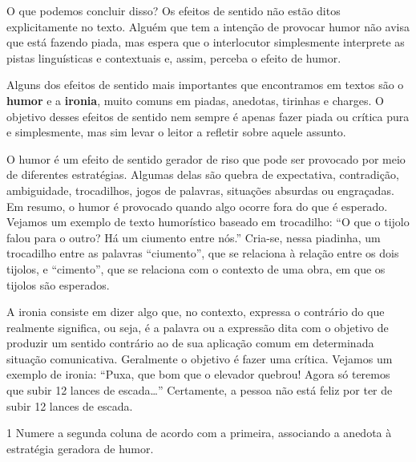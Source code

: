 O que podemos concluir disso? Os efeitos de sentido não estão ditos
explicitamente no texto. Alguém que tem a intenção de provocar humor não
avisa que está fazendo piada, mas espera que o interlocutor simplesmente
interprete as pistas linguísticas e contextuais e, assim, perceba o
efeito de humor.

Alguns dos efeitos de sentido mais importantes que encontramos em textos
são o \textbf{humor} e a \textbf{ironia}, muito comuns em piadas,
anedotas, tirinhas e charges. O objetivo desses efeitos de sentido nem
sempre é apenas fazer piada ou crítica pura e simplesmente, mas sim
levar o leitor a refletir sobre aquele assunto.

O humor é um efeito de sentido gerador de riso que pode ser provocado
por meio de diferentes estratégias. Algumas delas são quebra de
expectativa, contradição, ambiguidade, trocadilhos, jogos de palavras,
situações absurdas ou engraçadas. Em resumo, o humor é provocado quando
algo ocorre fora do que é esperado. Vejamos um exemplo de texto
humorístico baseado em trocadilho: ``O que o tijolo falou para o outro?
Há um ciumento entre nós.'' Cria-se, nessa piadinha, um trocadilho entre
as palavras ``ciumento'', que se relaciona à relação entre os dois
tijolos, e ``cimento'', que se relaciona com o contexto de uma obra, em
que os tijolos são esperados.

A ironia consiste em dizer algo que, no contexto, expressa o contrário
do que realmente significa, ou seja, é a palavra ou a expressão dita com
o objetivo de produzir um sentido contrário ao de sua aplicação comum em
determinada situação comunicativa. Geralmente o objetivo é fazer uma
crítica. Vejamos um exemplo de ironia: ``Puxa, que bom que o elevador
quebrou! Agora só teremos que subir 12 lances de escada\ldots{}''
Certamente, a pessoa não está feliz por ter de subir 12 lances de
escada.


\num{1} Numere a segunda coluna de acordo com a primeira, associando a
anedota à estratégia geradora de humor.

